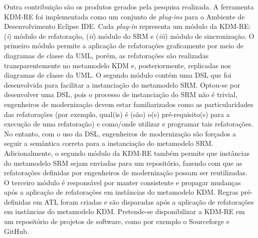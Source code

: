 Outra contribuição são os produtos gerados pela pesquisa realizada. A ferramenta KDM-RE foi implementada como um conjunto de \textit{plug-ins} para o Ambiente de Desenvolvimento Eclipse IDE. Cada \textit{plug-in} representa um módulo da KDM-RE: (\textit{i}) módulo de refatoração, (\textit{ii}) módulo do SRM e (\textit{iii}) módulo de sincronização. O primeiro módulo permite a aplicação de refatorações graficamente por meio de diagramas de classe da UML, porém, as refatorações são realizadas transparentemente no metamodelo KDM e, posteriormente, replicadas nos diagramas de classe da UML. O segundo módulo contém uma DSL que foi desenvolvida para facilitar a instanciação do metamodelo SRM. Optou-se por desenvolver uma DSL, pois o processo de instanciação do SRM não é trivial, engenheiros de modernização devem estar familiarizados como as particularidades das refatorações (por exemplo, qual(is) é (são) o(s) pré-requisito(s) para a execução de uma refatoração) e como/onde utilizar e programar tais refatorações. No entanto, com o uso da DSL, engenheiros de modernização são forçados a seguir a semântica correta para a instanciação do metamodelo SRM. Adicionalmente, o segundo módulo da KDM-RE também permite que instâncias do metamodelo SRM sejam enviadas para um repositório, fazendo com que as refatorações definidas por engenheiros de modernização possam ser reutilizadas. O terceiro módulo é responsável por manter consistente e propagar mudanças após a aplicação de refatorações em instâncias do metamodelo KDM. Regras pré-definidas em ATL foram criadas e são disparadas após a aplicação de refatorações em instâncias do metamodelo KDM. Pretende-se disponibilizar a KDM-RE em um repositório de projetos de software, como por exemplo o Sourceforge e GitHub.








